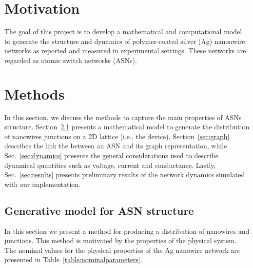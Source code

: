 \documentclass[preprint,10pt, authoryear, a4]{elsarticle}
\begin{document}
\linenumbers

\section{Motivation}
\label{sec:why}

The goal of this project is to develop a mathematical and computational model
to generate the structure and dynamics of polymer-coated silver (Ag) nanonwire
networks as reported and measured in experimental settings. These networks are
regarded as atomic switch networks (ASNs).

\section{Methods}
\label{sec:methods}

In this section, we discuss the methods to capture the main properties of ASNs
structure. Section~\ref{sec:needles} presents a mathematical model  to
generate the distribution of nanowires junctions on a 2D lattice (i.e., the
device). Section~\ref{sec:graph} describes the link the between an ASN and its
graph representation, while Sec.~\ref{sec:dynamics} presents the general considerations
used to describe dynamical quantities such as voltage, current and
conductance. Lastly, Sec.~\ref{sec:results} presents preliminary results of
the network dynamics simulated with our implementation.



\subsection{Generative model for ASN structure}
\label{sec:needles}

In this section we present a method for producing a distribution of
nanowires and junctions. This method is motivated by the properties of the
physical system. The nominal values for the physical properties of the Ag
nanowire network are presented in Table~\ref{table:nominalparameters}.
\end{document}
